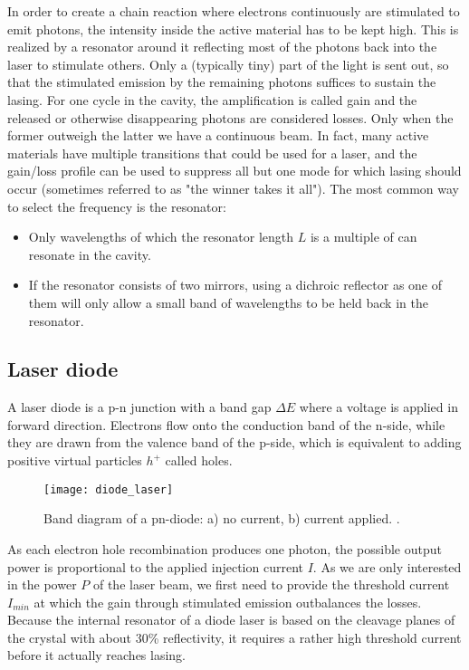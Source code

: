 In order to create a chain reaction where electrons continuously are stimulated to emit photons, the intensity inside the active material has to be kept high. This is realized by a resonator around it reflecting most of the photons back into the laser to stimulate others. Only a (typically tiny) part of the light is sent out, so that the stimulated emission by the remaining photons suffices to sustain the lasing. For one cycle in the cavity, the amplification is called gain and the released or otherwise disappearing photons are considered losses. Only when the former outweigh the latter we have a continuous beam. In fact, many active materials have multiple transitions that could be used for a laser, and the gain/loss profile can be used to suppress all but one mode for which lasing should occur (sometimes referred to as "the winner takes it all"). The most common way to select the frequency is the resonator:
\begin{itemize}
\item Only wavelengths of which the resonator length $L$ is a multiple of can resonate in the cavity.
\item If the resonator consists of two mirrors, using a dichroic reflector as one of them will only allow a small band of wavelengths to be held back in the resonator.
\end{itemize}

\newpage
\subsection{Laser diode}
\enlargethispage{2em}
A laser diode is a p-n junction with a band gap $\Delta E$ where a voltage is applied in forward direction. Electrons flow onto the conduction band of the n-side, while they are drawn from the valence band of the p-side, which is equivalent to adding positive virtual particles $h^+$ called holes.

\begin{figure}[h]
	\centering
	\texttt{[image: diode\_laser]}
	\caption{Band diagram of a pn-diode: a) no current, b) current applied. \cite{lit:leicester}.}
	\label{fig:diode}
\end{figure}

As each electron hole recombination produces one photon, the possible output power is proportional to the applied injection current $I$. As we are only interested in the power $P$ of the laser beam, we first need to provide the threshold current $I_{min}$ at which the gain through stimulated emission outbalances the losses. Because the internal resonator of a diode laser is based on the cleavage planes of the crystal with about 30\% reflectivity, it requires a rather high threshold current before it actually reaches lasing.

